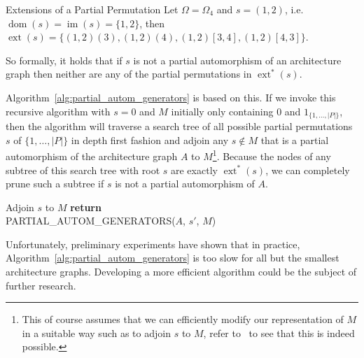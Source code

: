 \begin{exmp}{Extensions of a Partial Permutation}
  Let $\Omega = \Omega_4$ and $s = (1, 2)$, i.e. $\operatorname{dom}(s) =
  \operatorname{im}(s) = \{1,2\}$, then $\operatorname{ext}(s) = \{(1, 2)(3),
  (1, 2)(4), (1, 2)[3, 4], (1, 2)[4, 3]\}$.
\end{exmp}
%
So formally, it holds that if $s$ is not a partial automorphism of an
architecture graph then neither are any of the partial permutations in
$\operatorname{ext}^*(s)$.

Algorithm~\ref{alg:partial_autom_generators} is based on this. If we invoke
this recursive algorithm with $s = 0$ and $M$ initially only containing $0$ and
$1_{\{1,\dots,|P|\}}$, then the algorithm will traverse a search tree of all
possible partial permutations $s$ of $\{1, \dots, |P|\}$ in depth first
fashion and adjoin any $s \notin M$ that is a partial automorphism of the
architecture graph $A$ to $M$\footnote{This of course assumes that we can
efficiently modify our representation of $M$ in a suitable way such as to adjoin
$s$ to $M$, refer to~\cite{Mitchell} to see that this is indeed possible.}.
Because the nodes of any subtree of this search tree with root $s$ are exactly
$\operatorname{ext}^*(s)$, we can completely prune such a subtree if $s$ is not
a partial automorphism of $A$.

\begin{algorithm}
  \caption{Find partial automorphism inverse monoid generating set}
  \label{alg:partial_autom_generators}
  \begin{algorithmic}[1]
      \State Adjoin $s$ to $M$
    \Else
      \State \textbf{return}
    \EndIf
    \\
        \State PARTIAL\_AUTOM\_GENERATORS($A$, $s'$, $M$)
    \EndFor
  \EndProcedure
  \end{algorithmic}
\end{algorithm}

Unfortunately, preliminary experiments have shown that in practice,
Algorithm~\ref{alg:partial_autom_generators} is too slow for all but the
smallest architecture graphs. Developing a more efficient algorithm could be
the subject of further research.
